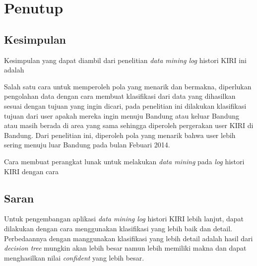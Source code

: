 \chapter{Penutup}

\section{Kesimpulan}

Kesimpulan yang dapat diambil dari penelitian \textsl{data mining log} histori KIRI ini adalah 

Salah satu cara untuk memperoleh pola yang menarik dan bermakna, diperlukan pengolahan data dengan cara membuat klasifikasi dari data yang dihasilkan sesuai dengan tujuan yang ingin dicari, pada penelitian ini dilakukan klasifikasi tujuan dari user apakah mereka ingin menuju Bandung atau keluar Bandung atau masih berada di area yang sama sehingga diperoleh pergerakan user KIRI di Bandung. Dari penelitian ini, diperoleh pola yang menarik bahwa user lebih sering menuju luar Bandung pada bulan Febuari 2014.

Cara membuat perangkat lunak untuk melakukan \textsl{data mining} pada \textsl{log} histori KIRI dengan cara 

\section{Saran}

Untuk pengembangan aplikasi \textsl{data mining log} histori KIRI lebih lanjut, dapat dilakukan dengan cara menggunakan klasifikasi yang lebih baik dan detail. Perbedaannya dengan manggunakan klasifikasi yang lebih detail adalah hasil dari \textsl{decision tree} mungkin akan lebih besar namun lebih memiliki makna dan dapat menghasilkan nilai \textsl{confident} yang lebih besar.